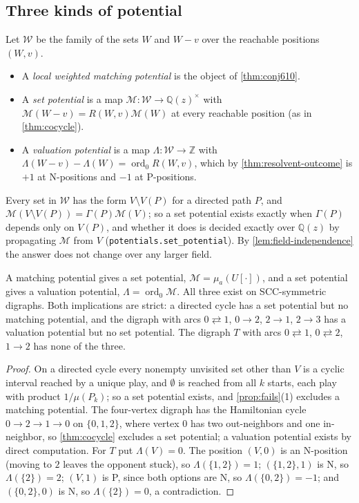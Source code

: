 \documentclass[final]{siamart0516}
\numberwithin{theorem}{section}
\numberwithin{equation}{section}
\theoremstyle{siamnonum}
\theoremstyle{plain}
\newcommand{\code}[1]{{\ttfamily\nolinkurl{#1}}}
\newcommand{\ZZ}{\mathbb{Z}}
\newcommand{\QQ}{\mathbb{Q}}
\newcommand{\Qz}{\QQ(z)}
\newcommand{\Mpot}{\mathcal{M}}           %
\newcommand{\ord}{\operatorname{ord}}
\begin{document}
\subsection{Three kinds of potential}\label{ssec:hierarchy}
Let $\mathcal W$ be the family of the sets $W$ and $W-v$ over the reachable positions $(W,v)$.
\begin{itemize}
\item A \emph{local weighted matching potential} is the object of \cref{thm:conj610}.
\item A \emph{set potential} is a map $\Mpot\colon\mathcal W\to\Qz^{\times}$ with $\Mpot(W-v)=R(W,v)\Mpot(W)$ at every reachable position (as in \cref{thm:cocycle}).
\item A \emph{valuation potential} is a map $\Lambda\colon\mathcal W\to\ZZ$ with $\Lambda(W-v)-\Lambda(W)=\ord_0R(W,v)$, which by \cref{thm:resolvent-outcome} is $+1$ at N-positions and $-1$ at P-positions.
\end{itemize}
Every set in $\mathcal W$ has the form $V\setminus V(P)$ for a directed path $P$, and $\Mpot(V\setminus V(P))=\Gamma(P)\Mpot(V)$; so a set potential exists exactly when $\Gamma(P)$ depends only on $V(P)$, and whether it does is decided exactly over $\Qz$ by propagating $\Mpot$ from $V$ (\code{potentials.set_potential}). By \cref{lem:field-independence} the answer does not change over any larger field.

\begin{theorem}[hierarchy]\label{thm:hierarchy}
A matching potential gives a set potential, $\Mpot=\mu_a(U[\cdot])$, and a set potential gives a valuation potential, $\Lambda=\ord_0\Mpot$. All three exist on SCC-symmetric digraphs. Both implications are strict: a directed cycle has a set potential but no matching potential, and the digraph with arcs $0\rightleftarrows1$, $0\to2$, $2\to1$, $2\to3$ has a valuation potential but no set potential. The digraph $T$ with arcs $0\rightleftarrows1$, $0\rightleftarrows2$, $1\to2$ has none of the three.
\end{theorem}
\begin{proof}
On a directed cycle every nonempty unvisited set other than $V$ is a cyclic interval reached by a unique play, and $\emptyset$ is reached from all $k$ starts, each play with product $1/\mu(P_k)$; so a set potential exists, and \cref{prop:fails}(1) excludes a matching potential. The four-vertex digraph has the Hamiltonian cycle $0\to2\to1\to0$ on $\{0,1,2\}$, where vertex $0$ has two out-neighbors and one in-neighbor, so \cref{thm:cocycle} excludes a set potential; a valuation potential exists by direct computation. For $T$ put $\Lambda(V)=0$. The position $(V,0)$ is an N-position (moving to $2$ leaves the opponent stuck), so $\Lambda(\{1,2\})=1$; $(\{1,2\},1)$ is N, so $\Lambda(\{2\})=2$; $(V,1)$ is P, since both options are N, so $\Lambda(\{0,2\})=-1$; and $(\{0,2\},0)$ is N, so $\Lambda(\{2\})=0$, a contradiction.
\end{proof}
\end{document}
